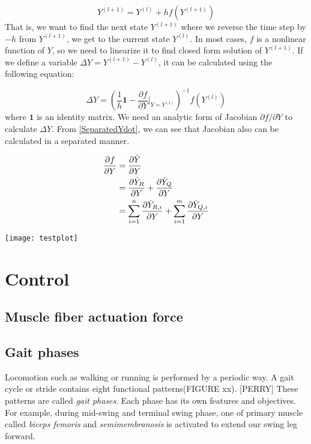 \documentclass[a4paper,10pt]{article}
\begin{document}
\begin{equation}
Y^{(l+1)}=Y^{(l)}+hf(Y^{(l+1)})
\end{equation}
That is, we want to find the next state $Y^{(l+1)}$ where we
reverse the time step by $-h$ from $Y^{(l+1)}$, we get to the current state
$Y^{(l)}$. In most cases, $f$ is a nonlinear function of $Y$, so we need to
linearize it to find closed form solution of $Y^{(l+1)}$. If we define a
variable $\Delta Y = Y^{(l+1)}-Y^{(l)}$, it can be calculated using the
following equation:

\begin{equation}\label{DeltaY}
\Delta Y = \left(  \frac{1}{h}\mathbf{1} - {\frac{\partial f}{\partial Y} \bigg|_{Y=Y^{(l)}}}\right)^{-1} f(Y^{(l)})
\end{equation}
where $\mathbf{1}$ is an identity matrix. We need an analytic form of
Jacobian $\partial f / \partial Y$ to calculate $\Delta Y$.
From \eqref{SeparatedYdot}, we can see that
Jacobian also can be calculated in a separated manner.


\begin{align}
\frac{\partial f}{\partial Y}
        & = \frac{\partial\dot{Y}}{\partial Y}\notag\\
        & = \frac{\partial\dot{Y}_R}{\partial Y} + \frac{\partial\dot{Y}_Q}{\partial Y}\notag\\
        & = \sum_{i=1}^{n}\frac{\partial\dot{Y}_{R,i}}{\partial Y} + \sum_{i=1}^{m}\frac{\partial\dot{Y}_{Q,i}}{\partial Y}
\end{align}

\texttt{[image: testplot]}




\section{Control}

\subsection{Muscle fiber actuation force}

\subsection{Gait phases}

Locomotion such as walking or running is performed by a periodic way.
A gait cycle or stride contains eight functional patterns(FIGURE xx).
[PERRY] These patterns are called \emph{gait phases}. Each phase has its
own features and objectives. For example, during mid-swing and terminal swing
phase, one of primary muscle called \emph{biceps femoris} and \emph{semimembranosis} is
activated to extend our swing leg forward.
\end{document}
